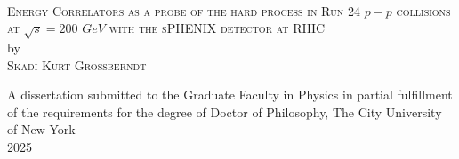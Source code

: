 \begin{titlepage}

\begin{center}

~\vspace{2in}

\textsc{Energy Correlators as a probe of the hard process in Run 24 $p-p$ collisions at $\sqrt{s}=200$ $GeV$ with the sPHENIX detector at RHIC} \\[0.5in]
by \\[0.5in]
\textsc{Skadi Kurt Grossberndt} 

\vspace{\fill}
A dissertation submitted to the Graduate Faculty in Physics in partial fulfillment of the requirements for the degree of Doctor of Philosophy, The City University of New York \\[0.25in]
2025

\end{center}

\end{titlepage}
